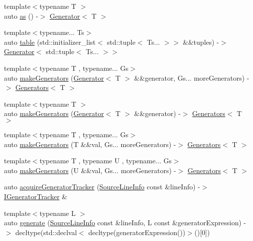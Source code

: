 \begin{DoxyCompactItemize}
\item 
{\footnotesize template$<$typename T $>$ }\\auto \mbox{\hyperlink{namespace_catch_1_1_generators_a333605e85ee023accfcc0bd4ff69c322}{as}} () -\/$>$ \mbox{\hyperlink{class_catch_1_1_generators_1_1_generator}{Generator}}$<$ T $>$
\item 
{\footnotesize template$<$typename... Ts$>$ }\\auto \mbox{\hyperlink{namespace_catch_1_1_generators_a82a6f998ff77cd9aae594ac6f8891bc1}{table}} (std\+::initializer\+\_\+list$<$ std\+::tuple$<$ Ts... $>$$>$ \&\&tuples) -\/$>$ \mbox{\hyperlink{class_catch_1_1_generators_1_1_generator}{Generator}}$<$ std\+::tuple$<$ Ts... $>$$>$
\item 
{\footnotesize template$<$typename T , typename... Gs$>$ }\\auto \mbox{\hyperlink{namespace_catch_1_1_generators_a4bc7b325c8cc81740e2527c689ff5d33}{make\+Generators}} (\mbox{\hyperlink{class_catch_1_1_generators_1_1_generator}{Generator}}$<$ T $>$ \&\&generator, Gs... more\+Generators) -\/$>$ \mbox{\hyperlink{struct_catch_1_1_generators_1_1_generators}{Generators}}$<$ T $>$
\item 
{\footnotesize template$<$typename T $>$ }\\auto \mbox{\hyperlink{namespace_catch_1_1_generators_a95506ebb833cdeb743e0068f52aa930b}{make\+Generators}} (\mbox{\hyperlink{class_catch_1_1_generators_1_1_generator}{Generator}}$<$ T $>$ \&\&generator) -\/$>$ \mbox{\hyperlink{struct_catch_1_1_generators_1_1_generators}{Generators}}$<$ T $>$
\item 
{\footnotesize template$<$typename T , typename... Gs$>$ }\\auto \mbox{\hyperlink{namespace_catch_1_1_generators_a0497b4463b7afee28df49631d6d75e83}{make\+Generators}} (T \&\&val, Gs... more\+Generators) -\/$>$ \mbox{\hyperlink{struct_catch_1_1_generators_1_1_generators}{Generators}}$<$ T $>$
\item 
{\footnotesize template$<$typename T , typename U , typename... Gs$>$ }\\auto \mbox{\hyperlink{namespace_catch_1_1_generators_a82a76355ef148099d60ca9c67a986104}{make\+Generators}} (U \&\&val, Gs... more\+Generators) -\/$>$ \mbox{\hyperlink{struct_catch_1_1_generators_1_1_generators}{Generators}}$<$ T $>$
\item 
auto \mbox{\hyperlink{namespace_catch_1_1_generators_a36413e3baec520d89d21bea23b7bea5b}{acquire\+Generator\+Tracker}} (\mbox{\hyperlink{struct_catch_1_1_source_line_info}{Source\+Line\+Info}} const \&line\+Info) -\/$>$ \mbox{\hyperlink{struct_catch_1_1_i_generator_tracker}{I\+Generator\+Tracker}} \&
\item 
{\footnotesize template$<$typename L $>$ }\\auto \mbox{\hyperlink{namespace_catch_1_1_generators_a8cfefd03dff0bdbf025e475a36b76528}{generate}} (\mbox{\hyperlink{struct_catch_1_1_source_line_info}{Source\+Line\+Info}} const \&line\+Info, L const \&generator\+Expression) -\/$>$ decltype(std\+::declval$<$ decltype(generator\+Expression())$>$()\mbox{[}0\mbox{]})
\end{DoxyCompactItemize}


